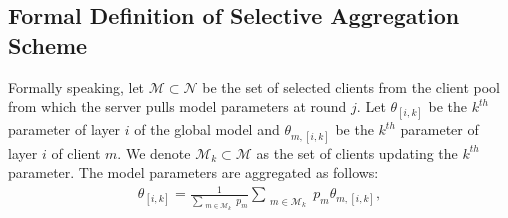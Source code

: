 \documentclass{article}
\begin{document}
\subsection{Formal Definition of Selective Aggregation Scheme}
Formally speaking, let $\mathcal{M} \subset \mathcal{N}$ be the set of selected clients from the client pool from which the server pulls model parameters at round $j$. Let $\theta_{[i, k]}$ be the $k^{th}$ parameter of layer $i$ of the global model and $\theta_{m, [i, k]}$ be the $k^{th}$ parameter of layer $i$ of client $m$. We denote $\mathcal{M}_k\subset\mathcal{M}$ as the set of clients updating the $k^{th}$ parameter. The model parameters are aggregated as follows:
\begin{align}
    \theta_{[i, k]} = \frac{1}{\sum_{\substack{m\in\mathcal{M}_k}} p_m} \sum_{\substack{m\in\mathcal{M}_k}} p_m\theta_{m, [i, k]},
    \label{eqn:theta_update}
\end{align}
\end{document}
